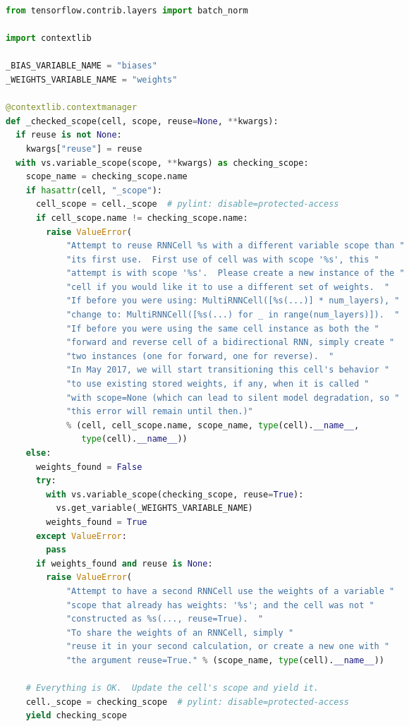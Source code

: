 \begin{landscape}
\begin{multicols}{2}
\begin{lstlisting}[language=Python]
from tensorflow.contrib.layers import batch_norm

import contextlib

_BIAS_VARIABLE_NAME = "biases"
_WEIGHTS_VARIABLE_NAME = "weights"

@contextlib.contextmanager
def _checked_scope(cell, scope, reuse=None, **kwargs):
  if reuse is not None:
    kwargs["reuse"] = reuse
  with vs.variable_scope(scope, **kwargs) as checking_scope:
    scope_name = checking_scope.name
    if hasattr(cell, "_scope"):
      cell_scope = cell._scope  # pylint: disable=protected-access
      if cell_scope.name != checking_scope.name:
        raise ValueError(
            "Attempt to reuse RNNCell %s with a different variable scope than "
            "its first use.  First use of cell was with scope '%s', this "
            "attempt is with scope '%s'.  Please create a new instance of the "
            "cell if you would like it to use a different set of weights.  "
            "If before you were using: MultiRNNCell([%s(...)] * num_layers), "
            "change to: MultiRNNCell([%s(...) for _ in range(num_layers)]).  "
            "If before you were using the same cell instance as both the "
            "forward and reverse cell of a bidirectional RNN, simply create "
            "two instances (one for forward, one for reverse).  "
            "In May 2017, we will start transitioning this cell's behavior "
            "to use existing stored weights, if any, when it is called "
            "with scope=None (which can lead to silent model degradation, so "
            "this error will remain until then.)"
            % (cell, cell_scope.name, scope_name, type(cell).__name__,
               type(cell).__name__))
    else:
      weights_found = False
      try:
        with vs.variable_scope(checking_scope, reuse=True):
          vs.get_variable(_WEIGHTS_VARIABLE_NAME)
        weights_found = True
      except ValueError:
        pass
      if weights_found and reuse is None:
        raise ValueError(
            "Attempt to have a second RNNCell use the weights of a variable "
            "scope that already has weights: '%s'; and the cell was not "
            "constructed as %s(..., reuse=True).  "
            "To share the weights of an RNNCell, simply "
            "reuse it in your second calculation, or create a new one with "
            "the argument reuse=True." % (scope_name, type(cell).__name__))

    # Everything is OK.  Update the cell's scope and yield it.
    cell._scope = checking_scope  # pylint: disable=protected-access
    yield checking_scope


\end{lstlisting}
\end{multicols}
\end{landscape}

